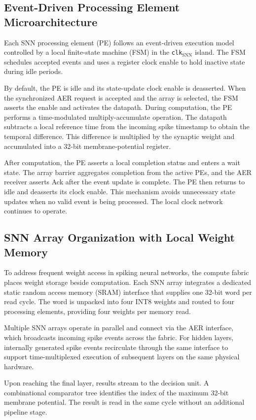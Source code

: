 ﻿\documentclass[12pt]{article}
\begin{document}
\subsection{Event-Driven Processing Element Microarchitecture}
Each SNN processing element (PE) follows an event-driven execution model controlled by a local finite-state machine (FSM) in the \texttt{clk}$_{\mathrm{SNN}}$ island. The FSM schedules accepted events and uses a register clock enable to hold inactive state during idle periods.

By default, the PE is idle and its state-update clock enable is deasserted. When the synchronized AER request is accepted and the array is selected, the FSM asserts the enable and activates the datapath. During computation, the PE performs a time-modulated multiply-accumulate operation. The datapath subtracts a local reference time from the incoming spike timestamp to obtain the temporal difference. This difference is multiplied by the synaptic weight and accumulated into a 32-bit membrane-potential register.

After computation, the PE asserts a local completion status and enters a wait state. The array barrier aggregates completion from the active PEs, and the AER receiver asserts Ack after the event update is complete. The PE then returns to idle and deasserts its clock enable. This mechanism avoids unnecessary state updates when no valid event is being processed. The local clock network continues to operate.


\subsection{SNN Array Organization with Local Weight Memory}

To address frequent weight access in spiking neural networks, the compute fabric places weight storage beside computation. Each SNN array integrates a dedicated static random access memory (SRAM) interface that supplies one 32-bit word per read cycle. The word is unpacked into four INT8 weights and routed to four processing elements, providing four weights per memory read.

Multiple SNN arrays operate in parallel and connect via the AER interface, which broadcasts incoming spike events across the fabric. For hidden layers, internally generated spike events recirculate through the same interface to support time-multiplexed execution of subsequent layers on the same physical hardware.

Upon reaching the final layer, results stream to the decision unit. A combinational comparator tree identifies the index of the maximum 32-bit membrane potential. The result is read in the same cycle without an additional pipeline stage.
\end{document}
